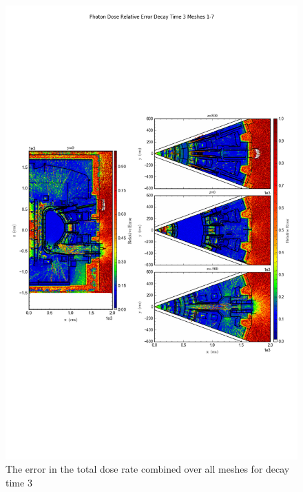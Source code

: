 \documentclass[12pt]{article}
\begin{document}
\begin{figure}[ht!]
\centering
\includegraphics[trim={0cm 9cm 0cm 10cm},clip,scale=0.75]{../plots/final_model_with_b4c/Photon_Dose_Relative_Error_Decay_Time_3_Meshes_1-7.png}
\caption{The error in the total dose rate combined over all meshes for decay time 3}
\label{fig:photons_dc3_b4c_total_error}
\end{figure}
\end{document}
